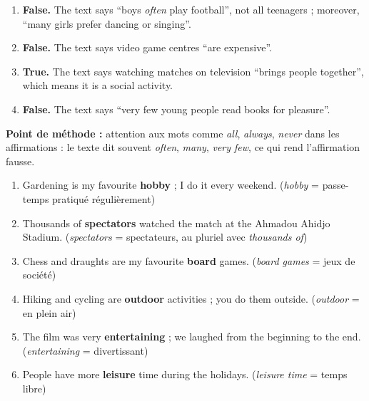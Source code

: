 \documentclass[11pt]{article}
\begin{document}
\begin{corrige}
\begin{enumerate}
\item \textbf{False.} The text says “boys \emph{often} play football”, not all teenagers ; moreover, “many girls prefer dancing or singing”.
\item \textbf{False.} The text says video game centres “are expensive”.
\item \textbf{True.} The text says watching matches on television “brings people together”, which means it is a social activity.
\item \textbf{False.} The text says “very few young people read books for pleasure”.
\end{enumerate}
\textbf{Point de méthode :} attention aux mots comme \emph{all}, \emph{always}, \emph{never} dans les affirmations : le texte dit souvent \emph{often}, \emph{many}, \emph{very few}, ce qui rend l'affirmation fausse.
\end{corrige}

\begin{corrige}
\begin{enumerate}
\item Gardening is my favourite \textbf{hobby} ; I do it every weekend. (\emph{hobby} = passe-temps pratiqué régulièrement)
\item Thousands of \textbf{spectators} watched the match at the Ahmadou Ahidjo Stadium. (\emph{spectators} = spectateurs, au pluriel avec \emph{thousands of})
\item Chess and draughts are my favourite \textbf{board} games. (\emph{board games} = jeux de société)
\item Hiking and cycling are \textbf{outdoor} activities ; you do them outside. (\emph{outdoor} = en plein air)
\item The film was very \textbf{entertaining} ; we laughed from the beginning to the end. (\emph{entertaining} = divertissant)
\item People have more \textbf{leisure} time during the holidays. (\emph{leisure time} = temps libre)
\end{enumerate}
\end{corrige}
\end{document}
